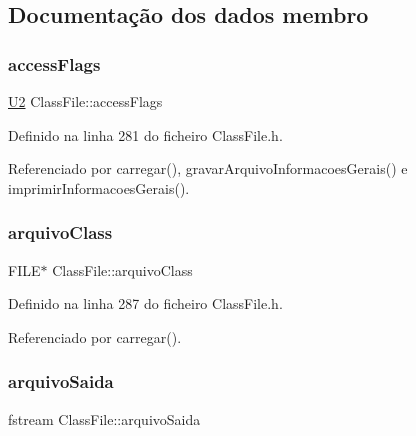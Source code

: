 \subsection{Documentação dos dados membro}
\mbox{\label{classClassFile_a16d2ca3e9cdf9267adde08575c57bfa9}} 
\subsubsection{\texorpdfstring{access\+Flags}{accessFlags}}
{\footnotesize\ttfamily \hyperlink{BasicTypes_8h_a90240657108b1b457eef9d3f76e0202e}{U2} Class\+File\+::access\+Flags\hspace{0.3cm}{\ttfamily [private]}}



Definido na linha 281 do ficheiro Class\+File.\+h.



Referenciado por carregar(), gravar\+Arquivo\+Informacoes\+Gerais() e imprimir\+Informacoes\+Gerais().

\mbox{\label{classClassFile_ae2be12dcc1a042970b4d7d7cf9709624}} 
\subsubsection{\texorpdfstring{arquivo\+Class}{arquivoClass}}
{\footnotesize\ttfamily F\+I\+LE$\ast$ Class\+File\+::arquivo\+Class\hspace{0.3cm}{\ttfamily [private]}}



Definido na linha 287 do ficheiro Class\+File.\+h.



Referenciado por carregar().

\mbox{\label{classClassFile_a4aee6c7763d46884d5b2c0297142df99}} 
\subsubsection{\texorpdfstring{arquivo\+Saida}{arquivoSaida}}
{\footnotesize\ttfamily fstream Class\+File\+::arquivo\+Saida\hspace{0.3cm}{\ttfamily [private]}}



